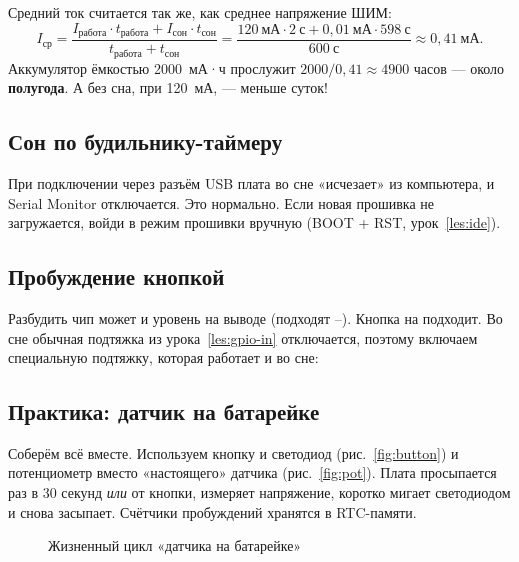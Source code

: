 Средний ток считается так же, как среднее напряжение ШИМ:
\[
  I_\text{ср} = \frac{I_\text{работа}\cdot t_\text{работа} + I_\text{сон}\cdot t_\text{сон}}{t_\text{работа}+t_\text{сон}}
  = \frac{120~\text{мА}\cdot 2~\text{с} + 0{,}01~\text{мА}\cdot 598~\text{с}}{600~\text{с}}
  \approx 0{,}41~\text{мА}.
\]
Аккумулятор ёмкостью 2000~мА·ч прослужит $2000 / 0{,}41 \approx 4900$ часов --- около \textbf{полугода}.
А без сна, при 120~мА, --- меньше суток!

\subsection{Сон по будильнику-таймеру}


\begin{caution}
При подключении через разъём USB плата во сне «исчезает» из компьютера, и Serial Monitor отключается.
Это нормально. Если новая прошивка не загружается, войди в режим прошивки вручную (BOOT + RST, урок~\ref{les:ide}).
\end{caution}

\subsection{Пробуждение кнопкой}

Разбудить чип может и уровень на выводе (подходят --). Кнопка на  подходит. Во сне
обычная подтяжка из урока~\ref{les:gpio-in} отключается, поэтому включаем специальную подтяжку, которая
работает и во сне:


\subsection{Практика: датчик на батарейке}

Соберём всё вместе. Используем кнопку и светодиод (рис.~\ref{fig:button}) и потенциометр вместо
«настоящего» датчика (рис.~\ref{fig:pot}). Плата просыпается раз в 30 секунд \emph{или} от кнопки,
измеряет напряжение, коротко мигает светодиодом и снова засыпает. Счётчики пробуждений хранятся в RTC-памяти.

\begin{figure}[H]
\centering
{}
\caption{Жизненный цикл «датчика на батарейке»}
\end{figure}

